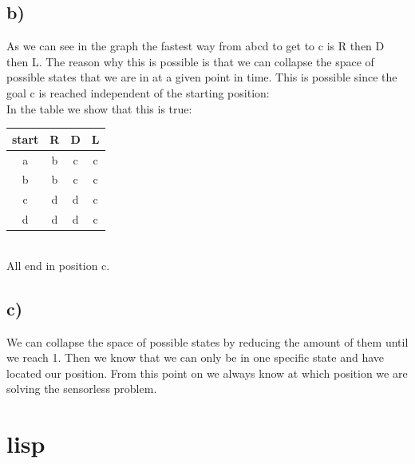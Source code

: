 \documentclass[12pt,a4paper]{scrartcl}
\begin{document}
	\subsection*{b)}
	As we can see in the graph the fastest way from abcd to get to c is R then D then L. The reason why this is possible is that we can collapse the space of possible states that we are in at a given point in time. This is possible since the goal c is reached independent of the starting position:\\
	In the table we show that this is true:\\
	\begin{tabular}{c | c | c | c }
		start & R & D & L \\ \hline
		a & b & c & c \\
		b & b & c & c  \\
		c & d & d & c \\
		d & d & d & c 
	\end{tabular}\\
	All end in position c.
	\subsection*{c)}
	We can collapse the space of possible states by reducing the amount of them until we reach 1. Then we know that we can only be in one specific state and have located our position. From this point on we always know at which position we are solving the sensorless problem.
\section{lisp}
	
\end{document}
